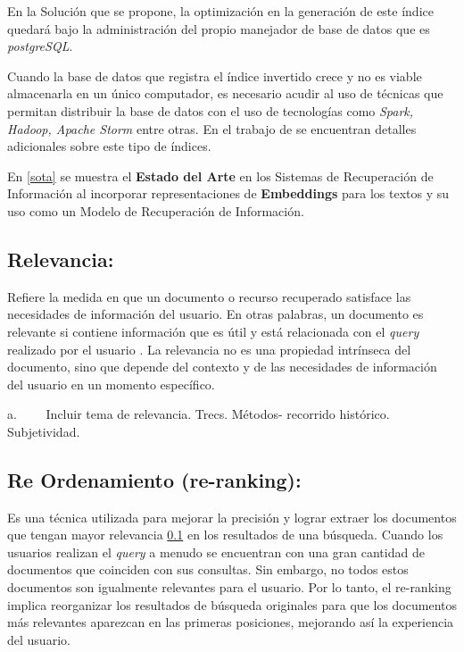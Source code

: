 \documentclass[
  10,
  openany]{book}
\begin{document}
En la Solución que se propone, la optimización en la generación de este índice quedará bajo la administración del propio manejador de base de datos que es \emph{postgreSQL}.

Cuando la base de datos que registra el índice invertido crece y no es viable almacenarla en un único computador, es necesario acudir al uso de técnicas que permitan distribuir la base de datos con el uso de tecnologías como \emph{Spark, Hadoop, Apache Storm} entre otras. En el trabajo de \citep{Mahapatra2011} se encuentran detalles adicionales sobre este tipo de índices.

En \ref{sota} se muestra el \textbf{Estado del Arte} en los Sistemas de Recuperación de Información al incorporar representaciones de \textbf{Embeddings} \citep{reimers2019} para los textos y su uso como un Modelo de Recuperación de Información.

\hypertarget{relevancia}{%
\subsection{Relevancia:}\label{relevancia}}

Refiere la medida en que un documento o recurso recuperado satisface las necesidades de información del usuario. En otras palabras, un documento es relevante si contiene información que es útil y está relacionada con el \emph{query} realizado por el usuario \citep{büttcher2010a}. La relevancia no es una propiedad intrínseca del documento, sino que depende del contexto y de las necesidades de información del usuario en un momento específico.

a.~~~~ Incluir tema de relevancia. Trecs. Métodos- recorrido histórico. Subjetividad.

\hypertarget{ranking}{%
\subsection{Re Ordenamiento (re-ranking):}\label{ranking}}

Es una técnica utilizada para mejorar la precisión y lograr extraer los documentos que tengan mayor relevancia \ref{relevancia} en los resultados de una búsqueda. Cuando los usuarios realizan el \emph{query} a menudo se encuentran con una gran cantidad de documentos que coinciden con sus consultas. Sin embargo, no todos estos documentos son igualmente relevantes para el usuario. Por lo tanto, el re-ranking implica reorganizar los resultados de búsqueda originales para que los documentos más relevantes aparezcan en las primeras posiciones, mejorando así la experiencia del usuario.
\end{document}
